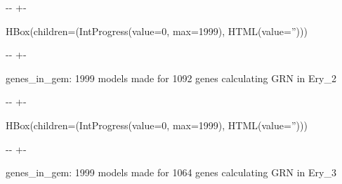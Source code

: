 \documentclass[letterpaper,10pt,english]{sphinxmanual}
\newlength\nbsphinxcodecellspacing
\begin{document}
{

\kern-\sphinxverbatimsmallskipamount\kern-\baselineskip
\kern+\FrameHeightAdjust\kern-\fboxrule
\vspace{\nbsphinxcodecellspacing}

\begin{sphinxVerbatim}[commandchars=\\\{\}]
HBox(children=(IntProgress(value=0, max=1999), HTML(value='')))
\end{sphinxVerbatim}
}

{

\kern-\sphinxverbatimsmallskipamount\kern-\baselineskip
\kern+\FrameHeightAdjust\kern-\fboxrule
\vspace{\nbsphinxcodecellspacing}

\begin{sphinxVerbatim}[commandchars=\\\{\}]

genes\_in\_gem: 1999
models made for 1092 genes
calculating GRN in Ery\_2
\end{sphinxVerbatim}
}

{

\kern-\sphinxverbatimsmallskipamount\kern-\baselineskip
\kern+\FrameHeightAdjust\kern-\fboxrule
\vspace{\nbsphinxcodecellspacing}

\begin{sphinxVerbatim}[commandchars=\\\{\}]
HBox(children=(IntProgress(value=0, max=1999), HTML(value='')))
\end{sphinxVerbatim}
}

{

\kern-\sphinxverbatimsmallskipamount\kern-\baselineskip
\kern+\FrameHeightAdjust\kern-\fboxrule
\vspace{\nbsphinxcodecellspacing}

\begin{sphinxVerbatim}[commandchars=\\\{\}]

genes\_in\_gem: 1999
models made for 1064 genes
calculating GRN in Ery\_3
\end{sphinxVerbatim}
}
\end{document}
